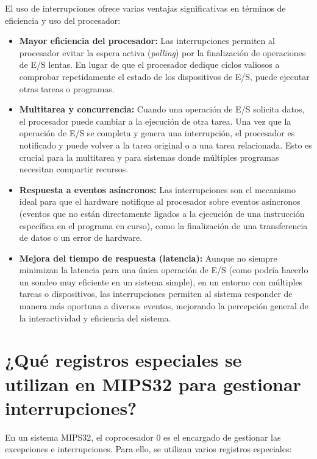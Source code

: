 \documentclass{article}
\begin{document}
El uso de interrupciones ofrece varias ventajas significativas en términos de eficiencia y uso del procesador:

\begin{itemize}[leftmargin=*, noitemsep]
    \item \textbf{Mayor eficiencia del procesador:} 
    Las interrupciones permiten al procesador evitar la espera activa (\textit{polling}) por la finalización de operaciones de E/S lentas. En lugar de que el procesador dedique ciclos valiosos a comprobar repetidamente el estado de los dispositivos de E/S, puede ejecutar otras tareas o programas.

    \item \textbf{Multitarea y concurrencia:} 
    Cuando una operación de E/S solicita datos, el procesador puede cambiar a la ejecución de otra tarea. Una vez que la operación de E/S se completa y genera una interrupción, el procesador es notificado y puede volver a la tarea original o a una tarea relacionada. Esto es crucial para la multitarea y para sistemas donde múltiples programas necesitan compartir recursos.

    \item \textbf{Respuesta a eventos asíncronos:} 
    Las interrupciones son el mecanismo ideal para que el hardware notifique al procesador sobre eventos asíncronos (eventos que no están directamente ligados a la ejecución de una instrucción específica en el programa en curso), como la finalización de una transferencia de datos o un error de hardware.

    \item \textbf{Mejora del tiempo de respuesta (latencia):} 
    Aunque no siempre minimizan la latencia para una única operación de E/S (como podría hacerlo un sondeo muy eficiente en un sistema simple), en un entorno con múltiples tareas o dispositivos, las interrupciones permiten al sistema responder de manera más oportuna a diversos eventos, mejorando la percepción general de la interactividad y eficiencia del sistema.
\end{itemize}

\section{¿Qué registros especiales se utilizan en MIPS32 para gestionar interrupciones?}

En un sistema MIPS32, el coprocesador 0 es el encargado de gestionar las excepciones e interrupciones. Para ello, se utilizan varios registros especiales:
\end{document}
